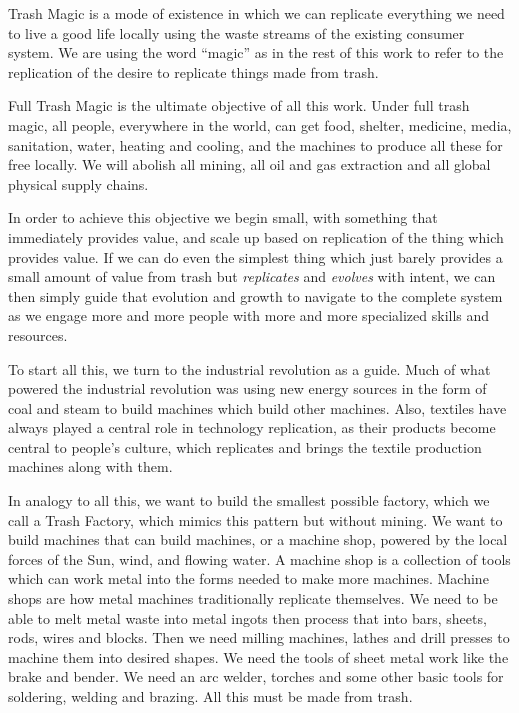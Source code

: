 
Trash Magic is a mode of existence in which we can replicate everything
we need to live a good life locally using the waste streams of the
existing consumer system. We are using the word ``magic'' as in the rest
of this work to refer to the replication of the desire to replicate
things made from trash.

Full Trash Magic is the ultimate objective of all this work. Under full
trash magic, all people, everywhere in the world, can get food, shelter,
medicine, media, sanitation, water, heating and cooling, and the
machines to produce all these for free locally. We will abolish all
mining, all oil and gas extraction and all global physical supply
chains.

In order to achieve this objective we begin small, with something that
immediately provides value, and scale up based on replication of the
thing which provides value. If we can do even the simplest thing which
just barely provides a small amount of value from trash but
\emph{replicates} and \emph{evolves} with intent, we can then simply
guide that evolution and growth to navigate to the complete system as we
engage more and more people with more and more specialized skills and
resources.

To start all this, we turn to the industrial revolution as a guide. Much
of what powered the industrial revolution was using new energy sources
in the form of coal and steam to build machines which build other
machines. Also, textiles have always played a central role in technology
replication, as their products become central to people's culture, which
replicates and brings the textile production machines along with them.

In analogy to all this, we want to build the smallest possible factory,
which we call a Trash Factory, which mimics this pattern but without
mining. We want to build machines that can build machines, or a machine
shop, powered by the local forces of the Sun, wind, and flowing water. A
machine shop is a collection of tools which can work metal into the
forms needed to make more machines. Machine shops are how metal machines
traditionally replicate themselves. We need to be able to melt metal
waste into metal ingots then process that into bars, sheets, rods, wires
and blocks. Then we need milling machines, lathes and drill presses to
machine them into desired shapes. We need the tools of sheet metal work
like the brake and bender. We need an arc welder, torches and some other
basic tools for soldering, welding and brazing. All this must be made
from trash.

